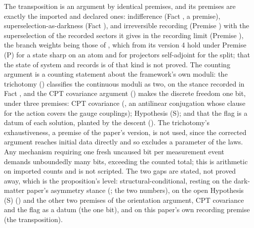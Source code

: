 The transposition is an argument by identical premises, and its premises are exactly the imported and declared ones: indifference (Fact , a premise), superselection-as-darkness (Fact ), and irreversible recording (Premise ) with the superselection of the recorded sectors it gives in the recording limit (Premise ), the branch weights being those of , which from its version 4 hold under Premise (P) for a state sharp on an atom and for projectors self-adjoint for the split; that the state of system and records is of that kind is not proved. The counting argument is a counting statement about the framework's own moduli: the trichotomy () classifies the continuous moduli as two, on the stance recorded in Fact , and the CPT covariance argument () makes the discrete freedom one bit, under three premises: CPT covariance (, an antilinear conjugation whose clause for the action covers the gauge couplings); Hypothesis (S); and that the flag is a datum of each solution, planted by the descent (). The trichotomy's exhaustiveness, a premise of the paper's version, is not used, since the corrected argument reaches initial data directly and so excludes a parameter of the laws. Any mechanism requiring one fresh uncaused bit per measurement event demands unboundedly many bits, exceeding the counted total; this is arithmetic on imported counts and is not scripted. The two gaps are stated, not proved away, which is the proposition's level: structural-conditional, resting on the dark-matter paper's asymmetry stance (; the two numbers), on the open Hypothesis (S) () and the other two premises of the orientation argument, CPT covariance and the flag as a datum (the one bit), and on this paper's own recording premise (the transposition).

